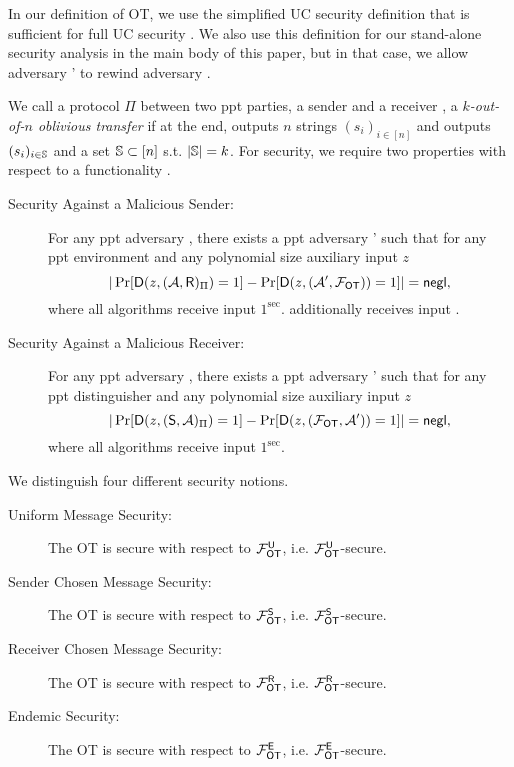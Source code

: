In our definition of OT, we use the simplified UC security definition that is sufficient for full UC security \cite{C:CanCohLin15}. We also use this definition for our stand-alone security analysis in the main body of this paper, but in that case, we allow adversary \Adv' to rewind adversary \Adv. 
\begin{definition}\label{def:otSec}
We call a protocol $\Pi$ between two ppt parties, a sender \send and a receiver \rec, a \emph{$k$-out-of-$n$ oblivious transfer} if %
at the end, \send outputs $n$ strings $(s_i)_{i\in[n]}$ and \rec outputs $(s_i)_{i\in\mathsf{\mathbb S}}$ and a set $\mathsf{\mathbb S}\subset[n]$ s.t. $|\mathsf{\mathbb S}|=k$. For security, we require two properties with respect to a functionality \OOT.
\begin{description}
\item[Security Against a Malicious Sender:] For any ppt adversary \Adv, there exists a ppt adversary \Adv' such that for any ppt environment \D and any polynomial size auxiliary input $z$
$$
|\Pr[\mathsf D(z,(\mathcal{A},\mathsf{R})_{\Pi})=1] -\Pr[\mathsf D(z,(\mathcal{A}', \mathcal{F}_{\mathsf{OT}}))=1]|=\mathsf{negl},
$$
where all algorithms receive input $1^\sec$. \rec additionally receives input \set.
\item[Security Against a Malicious Receiver:] For any ppt adversary \Adv, there exists a ppt adversary \Adv' such that for any ppt distinguisher \D and any polynomial size auxiliary input $z$
$$
|\Pr[\mathsf D(z, (\mathsf{S}, \mathcal{A})_{\Pi})=1] -\Pr[\mathsf D(z, (\mathcal{F}_{\mathsf{OT}},\mathcal{A}'))=1]|=\mathsf{negl},
$$
where all algorithms receive input $1^\sec$.
\end{description}


We distinguish four different security notions.
\begin{description}
\item[Uniform Message Security:] The OT is secure with respect to $\mathcal{F}_{\mathsf{OT}}^\mathsf{U}$, i.e. $\mathcal{F}_{\mathsf{OT}}^\mathsf{U}$-secure.
\item[Sender Chosen Message Security:] The OT is secure with respect to $\mathcal{F}_{\mathsf{OT}}^{\mathsf{S}}$, i.e. $\mathcal{F}_{\mathsf{OT}}^{\mathsf{S}}$-secure.
\item[Receiver Chosen Message Security:] The OT is secure with respect to $\mathcal{F}_{\mathsf{OT}}^{\mathsf{R}}$, i.e. $\mathcal{F}_{\mathsf{OT}}^{\mathsf{R}}$-secure.
\item[Endemic Security:] The OT is secure with respect to $\mathcal{F}_{\mathsf{OT}}^{\mathsf{E}}$, i.e. $\mathcal{F}_{\mathsf{OT}}^{\mathsf{E}}$-secure.
\end{description}


\end{definition}

